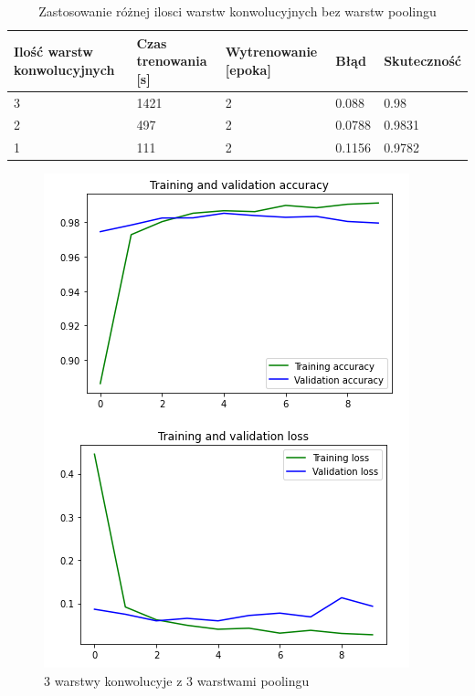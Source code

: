 \documentclass{article}
\begin{document}
\begin{table}[h]
  \centering
    
  \bgroup
  \def\arraystretch{1.3}
\begin{tabular}{|l|l|l|l|l|}
\hline
Ilość warstw konwolucyjnych & Czas trenowania [s] & Wytrenowanie [epoka] & Błąd & Skuteczność \\ \hline
3 & 1421 & 2 & 0.088 & 0.98 \\ \hline
2 & 497 & 2 & 0.0788 & 0.9831 \\ \hline
1 & 111 & 2 & 0.1156 & 0.9782 \\ \hline
\end{tabular}
  \egroup
  \vspace{10pt}
  \caption{Zastosowanie różnej ilosci warstw konwolucyjnych bez warstw poolingu}
\end{table}

\begin{figure}[!htb]
  \centering
  \includegraphics[width=\linewidth]{3_conv.png}
  \caption{3 warstwy konwolucyje z 3 warstwami poolingu}
\end{figure}
\end{document}
